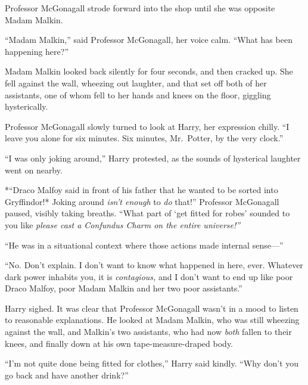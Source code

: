 Professor McGonagall strode forward into the shop until she was opposite
Madam Malkin.

``Madam Malkin,'' said Professor McGonagall, her voice calm. ``What has
been happening here?''

Madam Malkin looked back silently for four seconds, and then cracked up.
She fell against the wall, wheezing out laughter, and that set off both
of her assistants, one of whom fell to her hands and knees on the floor,
giggling hysterically.

Professor McGonagall slowly turned to look at Harry, her expression
chilly. ``I leave you alone for six minutes. Six minutes, Mr.~Potter, by
the very clock.''

``I was only joking around,'' Harry protested, as the sounds of
hysterical laughter went on nearby.

*``Draco Malfoy said in front of his father that he wanted to be sorted
into Gryffindor!* Joking around \emph{isn't enough} to \emph{do} that!''
Professor McGonagall paused, visibly taking breaths. ``What part of `get
fitted for robes' sounded to you like \emph{please cast a Confundus
Charm on the entire universe!''}

``He was in a situational context where those actions made internal
sense---''

``No. Don't explain. I don't want to know what happened in here, ever.
Whatever dark power inhabits you, it is \emph{contagious,} and I don't
want to end up like poor Draco Malfoy, poor Madam Malkin and her two
poor assistants.''

Harry sighed. It was clear that Professor McGonagall wasn't in a mood to
listen to reasonable explanations. He looked at Madam Malkin, who was
still wheezing against the wall, and Malkin's two assistants, who had
now \emph{both} fallen to their knees, and finally down at his own
tape-measure-draped body.

``I'm not quite done being fitted for clothes,'' Harry said kindly.
``Why don't you go back and have another drink?''
